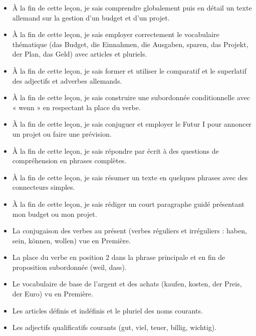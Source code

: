 \documentclass[11pt]{article}
\begin{document}
\begin{objectifs}
\begin{itemize}
\item À la fin de cette leçon, je sais comprendre globalement puis en détail un texte allemand sur la gestion d'un budget et d'un projet.
\item À la fin de cette leçon, je sais employer correctement le vocabulaire thématique (das Budget, die Einnahmen, die Ausgaben, sparen, das Projekt, der Plan, das Geld) avec articles et pluriels.
\item À la fin de cette leçon, je sais former et utiliser le comparatif et le superlatif des adjectifs et adverbes allemands.
\item À la fin de cette leçon, je sais construire une subordonnée conditionnelle avec « wenn » en respectant la place du verbe.
\item À la fin de cette leçon, je sais conjuguer et employer le Futur I pour annoncer un projet ou faire une prévision.
\item À la fin de cette leçon, je sais répondre par écrit à des questions de compréhension en phrases complètes.
\item À la fin de cette leçon, je sais résumer un texte en quelques phrases avec des connecteurs simples.
\item À la fin de cette leçon, je sais rédiger un court paragraphe guidé présentant mon budget ou mon projet.
\end{itemize}
\end{objectifs}

\begin{prerequis}
\begin{itemize}
\item La conjugaison des verbes au présent (verbes réguliers et irréguliers : haben, sein, können, wollen) vue en Première.
\item La place du verbe en position 2 dans la phrase principale et en fin de proposition subordonnée (weil, dass).
\item Le vocabulaire de base de l'argent et des achats (kaufen, kosten, der Preis, der Euro) vu en Première.
\item Les articles définis et indéfinis et le pluriel des noms courants.
\item Les adjectifs qualificatifs courants (gut, viel, teuer, billig, wichtig).
\end{itemize}
\end{prerequis}

\newpage
\end{document}
